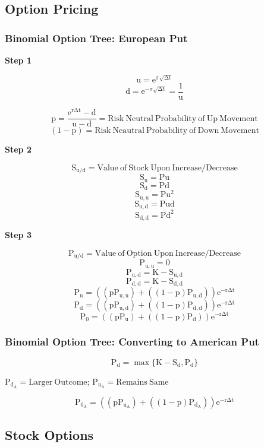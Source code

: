 \documentclass[11pt, english]{article}
\begin{document}
\newpage

	\subsection{Option Pricing}

		\subsubsection{Binomial Option Tree: European Put}

	\textbf{Step 1}

	$$\mathrm{u=e^{\sigma\sqrt{\Delta t}}}$$
	$$\mathrm{d=e^{-\sigma\sqrt{\Delta t}}=\frac{1}{u}}$$

	$$\mathrm{p=\frac{e^{r\Delta t}-d}{u-d}=Risk\ Neutral\ Probability\ of\ Up\ Movement}$$
	$$\mathrm{(1-p)=Risk\ Neautral\ Probability\ of\ Down\ Movement}$$

	\textbf{Step 2}

	$$\mathrm{S_{u/d}=Value\ of\ Stock\ Upon\ Increase/Decrease}$$
	$$\mathrm{S_u=Pu}$$
	$$\mathrm{S_d=Pd}$$
	$$\mathrm{S_{u,u}=Pu^2}$$
	$$\mathrm{S_{u,d}=Pud}$$
	$$\mathrm{S_{d,d}=Pd^2}$$

	\textbf{Step 3}

	$$\mathrm{P_{u/d}=Value\ of\ Option\ Upon\ Increase/Decrease}$$
	$$\mathrm{P_{u,u}=0}$$
	$$\mathrm{P_{u,d}=K-S_{u,d}}$$
	$$\mathrm{P_{d,d}=K-S_{d,d}}$$
	$$\mathrm{P_u=\left((pP_{u,u})+\left((1-p)P_{u,d}\right)\right)e^{-r\Delta t}}$$
	$$\mathrm{P_d=\left((pP_{u,d})+\left((1-p)P_{d,d}\right)\right)e^{-r\Delta t}}$$
	$$\mathrm{P_0=\left((pP_u)+\left((1-p)P_d\right)\right)e^{-r\Delta t}}$$

		\subsubsection{Binomial Option Tree: Converting to American Put}

	$$\mathrm{P_d=\max\{K-S_d,P_d\}}$$
	\begin{center}$\mathrm{P_{d_A}=Larger\ Outcome}$; $\mathrm{P_{u_A}=Remains\ Same}$\end{center}
	$$\mathrm{P_{0_A}=\left((pP_{u_A})+\left((1-p)P_{d_A}\right)\right)e^{-r\Delta t}}$$

\newpage

	\subsection{Stock Options}
\end{document}
